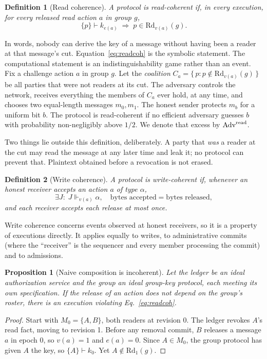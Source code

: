 \documentclass[aps,prx,reprint,superscriptaddress,nofootinbib,floatfix]{revtex4-2}
\newtheorem{definition}{Definition}
\newtheorem{proposition}{Proposition}
\theoremstyle{remark}
\newcommand{\justifies}{\Vdash}           %
\newcommand{\Rd}{\mathrm{Rd}}             %
\newcommand{\cut}{v}                      %
\newcommand{\roster}{M}
\newcommand{\derives}{\vdash}
\newcommand{\Adv}{\mathrm{Adv}}
\begin{document}
\begin{definition}[Read coherence]
A protocol is \emph{read-coherent} if, in every execution, for every released read action $a$ in group $g$,
\begin{equation}
\{p\}\derives k_{e(a)} \;\Longrightarrow\; p\in \Rd_{\cut(a)}(g).
\label{eq:readcoh}
\end{equation}
\end{definition}
In words, nobody can derive the key of a message without having been a reader at that message's cut. Equation~\eqref{eq:readcoh} is the symbolic statement. The computational statement is an indistinguishability game rather than an event. Fix a challenge action $a$ in group $g$. Let the \emph{coalition} $C_a=\{\,p:p\notin \Rd_{\cut(a)}(g)\,\}$ be all parties that were not readers at its cut. The adversary controls the network, receives everything the members of $C_a$ ever hold, at any time, and chooses two equal-length messages $m_0,m_1$. The honest sender protects $m_b$ for a uniform bit $b$. The protocol is read-coherent if no efficient adversary guesses $b$ with probability non-negligibly above $1/2$. We denote that excess by $\Adv^{\rm read}$.

Two things lie outside this definition, deliberately. A party that \emph{was} a reader at the cut may read the message at any later time and leak it; no protocol can prevent that. Plaintext obtained before a revocation is not erased.

\begin{definition}[Write coherence]
A protocol is \emph{write-coherent} if, whenever an honest receiver accepts an action $a$ of type $\alpha$,
\begin{equation}
\exists J:\; J\justifies_{\cut(a)}\alpha,\quad \text{bytes accepted}=\text{bytes released},
\label{eq:writecoh}
\end{equation}
and each receiver accepts each release at most once.
\end{definition}
Write coherence concerns events observed at honest receivers, so it is a property of executions directly. It applies equally to writes, to administrative commits (where the ``receiver'' is the sequencer and every member processing the commit) and to admissions.

\begin{proposition}[Naive composition is incoherent]\label{prop:naive}
Let the ledger be an ideal authorization service and the group an ideal group-key protocol, each meeting its own specification. If the release of an action does not depend on the group's roster, there is an execution violating Eq.~\eqref{eq:readcoh}.
\end{proposition}
\begin{proof}
Start with $\roster_0=\{A,B\}$, both readers at revision 0. The ledger revokes $A$'s read fact, moving to revision 1. Before any removal commit, $B$ releases a message $a$ in epoch 0, so $\cut(a)=1$ and $e(a)=0$. Since $A\in\roster_0$, the group protocol has given $A$ the key, so $\{A\}\derives k_0$. Yet $A\notin \Rd_1(g)$.
\end{proof}
\end{document}
